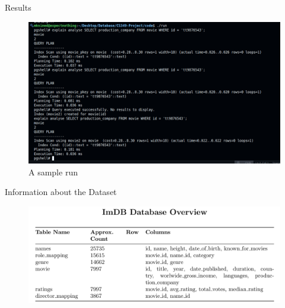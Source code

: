 \documentclass[Serif, 10pt, brown]{beamer}
\theoremstyle{example}
\theoremstyle{plain}
\begin{document}
\begin{frame}{Results}
	\begin{figure}
        \centering
        \includegraphics[width=1\linewidth]{../images/Screenshot from 2025-05-01 11-37-42.png}
        \caption{A sample run}
    \end{figure}
\end{frame}

\begin{frame}{Information about the Dataset}
	\begin{figure}
        \centering
        \includegraphics[width=1\linewidth]{../images/Screenshot from 2025-05-01 12-10-35.png}
    \end{figure}
\end{frame}
\end{document}

